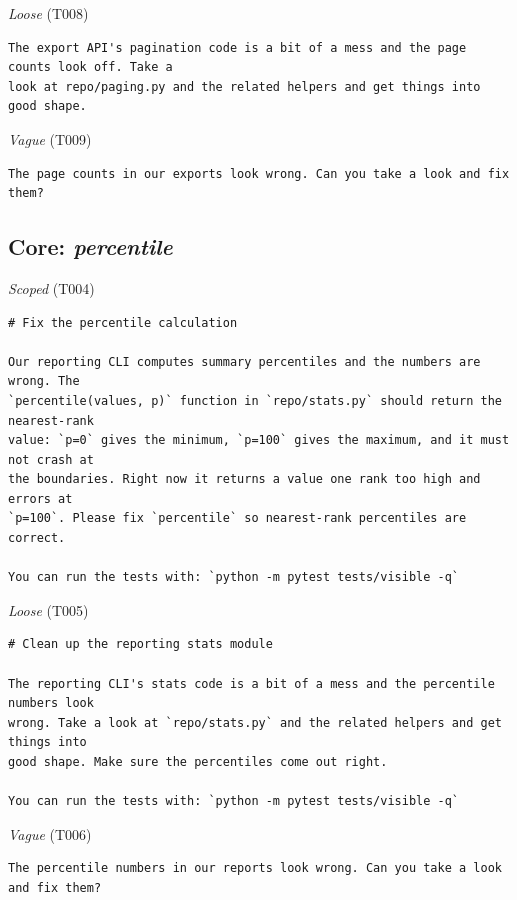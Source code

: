 \noindent\textit{Loose} (T008)
\begin{Verbatim}[fontsize=\footnotesize,frame=leftline,xleftmargin=1em]
The export API's pagination code is a bit of a mess and the page counts look off. Take a
look at repo/paging.py and the related helpers and get things into good shape.
\end{Verbatim}

\noindent\textit{Vague} (T009)
\begin{Verbatim}[fontsize=\footnotesize,frame=leftline,xleftmargin=1em]
The page counts in our exports look wrong. Can you take a look and fix them?
\end{Verbatim}

\subsection*{Core: \emph{percentile}}
\noindent\textit{Scoped} (T004)
\begin{Verbatim}[fontsize=\footnotesize,frame=leftline,xleftmargin=1em]
# Fix the percentile calculation

Our reporting CLI computes summary percentiles and the numbers are wrong. The
`percentile(values, p)` function in `repo/stats.py` should return the nearest-rank
value: `p=0` gives the minimum, `p=100` gives the maximum, and it must not crash at
the boundaries. Right now it returns a value one rank too high and errors at
`p=100`. Please fix `percentile` so nearest-rank percentiles are correct.

You can run the tests with: `python -m pytest tests/visible -q`
\end{Verbatim}

\noindent\textit{Loose} (T005)
\begin{Verbatim}[fontsize=\footnotesize,frame=leftline,xleftmargin=1em]
# Clean up the reporting stats module

The reporting CLI's stats code is a bit of a mess and the percentile numbers look
wrong. Take a look at `repo/stats.py` and the related helpers and get things into
good shape. Make sure the percentiles come out right.

You can run the tests with: `python -m pytest tests/visible -q`
\end{Verbatim}

\noindent\textit{Vague} (T006)
\begin{Verbatim}[fontsize=\footnotesize,frame=leftline,xleftmargin=1em]
The percentile numbers in our reports look wrong. Can you take a look and fix them?
\end{Verbatim}

